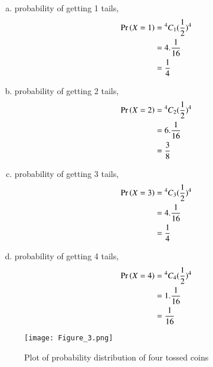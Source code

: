 \documentclass[journal,12pt,twocolumn]{IEEEtran}
\begin{document}
\begin{enumerate}[(i)]
\begin{enumerate}[(a)]
    \item probability of getting 1 tails,
        \begin{align}
            \begin{split}
                \Pr\left(X=1\right) &= {^4C_1}(\frac{1}{2})^4\\
                &=4.\frac{1}{16}\\
                &=\frac{1}{4}
            \end{split}
        \end{align}

    \item probability of getting 2 tails,
        \begin{align}
            \begin{split}
                \Pr\left(X=2\right) &= {^4C_2}(\frac{1}{2})^4\\
                &=6.\frac{1}{16}\\
                &=\frac{3}{8}
            \end{split}
        \end{align}

    \item probability of getting 3 tails,
        \begin{align}
            \begin{split}
                \Pr\left(X=3\right) &= {^4C_3}(\frac{1}{2})^4\\
                &=4.\frac{1}{16}\\
                &=\frac{1}{4}
            \end{split}
        \end{align}

\item probability of getting 4 tails,
        \begin{align}
            \begin{split}
                \Pr\left(X=4\right) &= {^4C_4}(\frac{1}{2})^4\\
                &=1.\frac{1}{16}\\
                &=\frac{1}{16}
            \end{split}
        \end{align}
\end{enumerate}

\begin{figure}[h!]
    \centering
    \texttt{[image: Figure\_3.png]}
    \caption{Plot of probability distribution of four tossed coins}
    \label{fig:Four coins}
\end{figure}
\end{enumerate}
\end{document}
